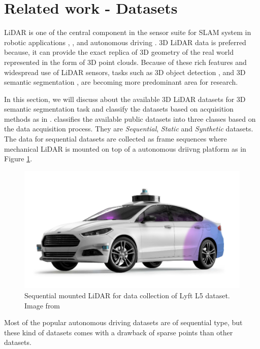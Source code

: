 \section{Related work - Datasets}
LiDAR is one of the central component in the sensor suite for SLAM system in robotic applications \cite{thrun2006stanley}, \cite{patz2008practical}, \cite{hess20162dSLAM} and autonomous driving \cite{li2016vehicle}.
3D LiDAR data is preferred because, it can provide the exact replica of 3D geometry of the real world represented in the form of 3D point clouds.
Because of these rich features and widespread use of LiDAR sensors, tasks such as 3D object detection \cite{zhou2018voxelnet}, \cite{PIXOR} and 3D semantic segmentation \cite{qi2017pointnet++}, \cite{3Dmininet} are becoming more predominant area for research.

In this section, we will discuss about the available 3D LiDAR datasets for 3D semantic segmentation task and classify the datasets based on acquisition methods as in \cite{survey3d}.
\cite{survey3d} classifies the available public datasets into three classes based on the data acquisition process.
They are \textit{Sequential}, \textit{Static} and \textit{Synthetic} datasets.
The data for sequential datasets are collected as frame sequences where mechanical LiDAR is mounted on top of a autonomous driivng platform as in Figure \ref{fig:seq_data_lyft}.
\begin{figure}[h!]
    \centering
    \includegraphics[scale=0.25]{images/sequential_lyft.png}
    \caption{Sequential mounted LiDAR for data collection of Lyft L5 dataset. Image from \cite{Lyftl5}}
    \label{fig:seq_data_lyft}
\end{figure}
Most of the popular autonomous driving datasets are of sequential type, but these kind of datasets comes with a drawback of sparse points than other datasets.

